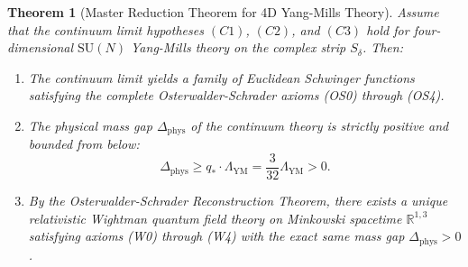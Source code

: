 \documentclass[11pt,reqno]{amsart}
\theoremstyle{plain}
\newtheorem{theorem}{Theorem}[section]
\theoremstyle{definition}
\theoremstyle{remark}
\numberwithin{equation}{section}
\begin{document}
\begin{theorem}[Master Reduction Theorem for 4D Yang-Mills Theory]
\label{thm:master_reduction}
Assume that the continuum limit hypotheses $(C1)$, $(C2)$, and $(C3)$ hold for four-dimensional $\mathrm{SU}(N)$ Yang-Mills theory on the complex strip $S_\delta$. Then:
\begin{enumerate}
\item The continuum limit yields a family of Euclidean Schwinger functions satisfying the complete Osterwalder-Schrader axioms (OS0) through (OS4).
\item The physical mass gap $\Delta_{\mathrm{phys}}$ of the continuum theory is strictly positive and bounded from below:
\begin{equation}
\label{eq:master_gap_bound}
\Delta_{\mathrm{phys}} \ge q_* \cdot \Lambda_{\mathrm{YM}} = \frac{3}{32} \Lambda_{\mathrm{YM}} > 0.
\end{equation}
\item By the Osterwalder-Schrader Reconstruction Theorem, there exists a unique relativistic Wightman quantum field theory on Minkowski spacetime $\mathbb{R}^{1,3}$ satisfying axioms (W0) through (W4) with the exact same mass gap $\Delta_{\mathrm{phys}} > 0$.
\end{enumerate}
\end{theorem}
\end{document}
